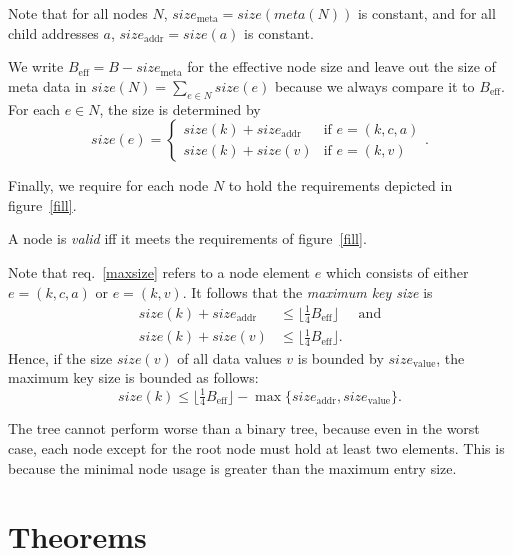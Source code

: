 \documentclass{vldb}
\newcommand \Beff { B_{\text{eff}} }
\begin{document}
\begin{defi}
Note that for all nodes $N$, $size_\text{meta} = size(meta(N))$ is constant,
and for all child addresses $a$, $size_\text{addr} = size(a)$ is constant.

We write $\Beff = B - size_\text{meta}$ for the effective node size and leave
out the size of meta data in $size(N) = \sum_{e \in N} size(e)$ because we
always compare it to $\Beff$.
For each $e \in N$, the size is determined by
\[ size(e) = \begin{cases}
size(k) + size_\text{addr} & \text{if } e = (k,c,a)\\
size(k) + size(v)          & \text{if } e = (k,v)
\end{cases}. \]

Finally, we require for each node $N$ to hold the requirements depicted in
figure~\ref{fill}.
\end{defi}


\begin{defi}
A node is {\em valid} iff it meets the requirements of figure~\ref{fill}.
\end{defi}


\begin{rem}
Note that req.~\ref{maxsize} refers to a node element $e$ which consists
of either \mbox{$e = (k, c, a)$} or \mbox{$e = (k, v)$}.
It follows that the {\em maximum key size} is
\begin{align*}
size(k) + size_\text{addr}
    &\leq \lfloor \tfrac{1}{4} \Beff \rfloor & \text{ and}\\
size(k) + size(v)
    &\leq \lfloor \tfrac{1}{4} \Beff \rfloor.
\end{align*}
Hence, if the size $size(v)$ of all data values $v$ is bounded by
$size_\text{value}$, the maximum key size is bounded as follows:
\[ size(k) \leq \lfloor \tfrac{1}{4} \Beff \rfloor 
    - \max \{ size_\text{addr}, size_\text{value} \}. \]
\end{rem}


\begin{rem}
The tree cannot perform worse than a binary tree, because even in the worst
case, each node except for the root node must hold at least two elements.
This is because the minimal node usage is greater than the maximum entry size.
\end{rem}



\section{Theorems} %
\end{document}
